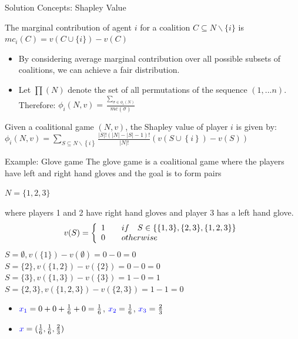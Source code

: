 \documentclass{beamer}
\begin{document}
\begin{frame}{Solution Concepts: Shapley Value}
    \begin{definition} \label{dfn:marginalcontribution}
        The {\color{blue}marginal contribution} of agent $i$ for a coalition $C \subseteq N \backslash \{i\}$ is $mc_i(C) = v(C \cup \{i\}) - v(C)$
    \end{definition}

    \begin{itemize}
        \item By considering average marginal contribution over all possible subsets of coalitions, we can achieve a fair distribution.\\
        \item Let $\prod(N)$ denote the set of all permutations of the sequence $(1,...n)$. Therefore: $\phi_i(N,v) = \frac{\sum_{\sigma \in \phi_i(N)}}{mc(\sigma)}$
    \end{itemize}

    \begin{definition} \label{dfn:shapleyvalue}
        Given a coalitional game $(N,v)$, the Shapley value of player $i$ is given by: \\
        $\phi_i(N,v) = \sum_{S \subseteq N \backslash \left\{i\right\} } \frac{|S|! (|N|-|S|-1)!}{|N|!} (v(S \cup \left\{i\right\}) - v(S))$
    \end{definition}
\end{frame}

\begin{frame} {Example: Glove game}
    The {\color{blue}glove game} is a coalitional game where the players have left and right hand gloves and the goal is to form pairs
    \begin{center}
      $N = \{1,2,3\}$ \\
    \end{center}
    where players 1 and 2 have right hand gloves and player 3 has a left hand glove.
    \[ v(S) = \left\{
      \begin{array}{l l}
        1 & \quad if \quad S \in \{\{1,3\},\{2,3\},\{1,2,3\}\} \\
        0 & \quad otherwise
      \end{array} \right.\]
    $S = \emptyset, v(\{1\}) - v(\emptyset) = 0 - 0 = 0$ \\
    $S = \{2\}, v(\{1,2\}) - v(\{2\}) = 0 - 0 = 0$ \\
    $S = \{3\}, v(\{1,3\}) - v(\{3\}) = 1 - 0 = 1$ \\
    $S = \{2,3\}, v(\{1,2,3\}) - v(\{2,3\}) = 1 - 1 = 0$ \\
    \begin{itemize}
        \item ${\color{blue}x_1} = 0 + 0 + \frac{1}{6} + 0 = \frac{1}{6}$, ${\color{blue}x_2} = \frac{1}{6}$, ${\color{blue}x_3} = \frac{2}{3}$
        \item ${\color{blue}x} = (\frac{1}{6}, \frac{1}{6}, \frac{2}{3})$
    \end{itemize}
\end{frame}
\end{document}
